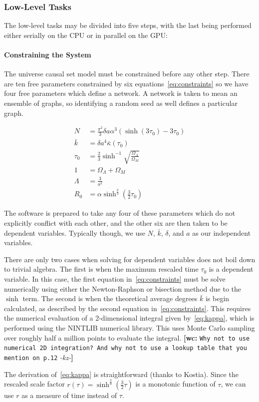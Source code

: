 \documentclass[preprint,notitlepage,amsmath,amssymb,floatfix]{revtex4-1}
\newcommand{\XXX}[3]{{\bf [#1: } {\tt #3} {\it -#2-}{\bf ]}}
\begin{document}
\subsubsection{Low-Level Tasks}
The low-level tasks may be divided into five steps, with the last being performed either serially on the CPU or in parallel on the GPU:
\paragraph{Constraining the System}
The universe causal set model must be constrained before any other step.  
There are ten free parameters constrained by six equations~\eqref{eq:constraints} so we have four free parameters which define a network.  
A network is taken to mean an ensemble of graphs, so identifying a random seed as well defines a particular graph.

\begin{equation}
\label{eq:constraints}
\begin{split}
N &= \frac{\pi^2}{3}\delta a\alpha^3\left(\sinh\left(3\tau_0\right)-3\tau_0\right) \\
\bar{k} &= \delta a^4\bar{\kappa}\left(\tau_0\right) \\
\tau_0 &= \frac{2}{3}\sinh^{-1}\sqrt{\frac{\Omega_\Lambda}{\Omega_M}} \\
1 &= \Omega_\Lambda + \Omega_M \\
\Lambda &= \frac{3}{a^2} \\
R_0 &= \alpha\sinh^{\frac{2}{3}}\left(\frac{3}{2}\tau_0\right)
\end{split}
\end{equation}

\noindent The software is prepared to take any four of these parameters which do not explicitly conflict with each other, and the other six are then taken to be dependent variables.  
Typically though, we use $N$, $\bar{k}$, $\delta$, and $a$ as our independent variables. \par
There are only two cases when solving for dependent variables does not boil down to trivial algebra.  
The first is when the maximum rescaled time $\tau_0$ is a dependent variable.  
In this case, the first equation in~\eqref{eq:constraints} must be solve numerically using either the Newton-Raphson or bisection method due to the $\sinh$ term.  
The second is when the theoretical average degrees $\bar{k}$ is begin calculated, as described by the second equation in~\eqref{eq:constraints}.  
This requires the numerical evaluation of a 2-dimensional integral given by~\eqref{eq:kappa}, which is performed using the NINTLIB numerical library.  
This uses Monte Carlo sampling over roughly half a million points to evaluate the integral. \XXX{wc}{kz}{Why not to use numerical 2D integration? And why not to use a lookup table that you mention on p.12} \par
The derivation of~\eqref{eq:kappa} is straightforward (thanks to Kostia).
Since the rescaled scale factor $r\left(\tau\right) = \sinh^{\frac{2}{3}}\left(\frac{3}{2}\tau\right)$ is a monotonic function of $\tau$, we can use $r$ as a measure of time instead of $\tau$.
\end{document}
